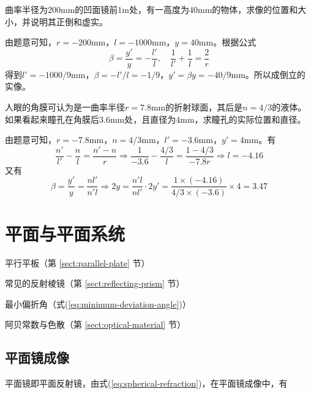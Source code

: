 \documentclass[cn,10pt,chinesefont=founder,math=mtpro2,cite=super,toc=onecol,twoside,openany]{elegantbook}
\begin{document}
\begin{problem}
	曲率半径为$200\mathrm{mm}$的凹面镜前$1\mathrm{m}$处，有一高度为$40\mathrm{mm}$的物体，求像的位置和大小，并说明其正倒和虚实。
\end{problem}
\begin{solution}
	由题意可知，$r=-200\mathrm{mm}$，$l=-1000\mathrm{mm}$，$y=40\mathrm{mm}$。根据公式
	\begin{equation}
	\beta=\frac{y'}{y}=-\frac{l'}{l},\quad \frac{1}{l'}+\frac{1}{l}=\frac{2}{r} \nonumber
	\end{equation}
	得到$l'=-1000/9\mathrm{mm}$，$\beta=-l'/l=-1/9$，$y'=\beta y=-40/9\mathrm{mm}$。所以成倒立的实像。
\end{solution}
\begin{problem}
	人眼的角膜可认为是一曲率半径$r=7.8\mathrm{mm}$的折射球面，其后是$n=4/3$的液体。如果看起来瞳孔在角膜后$3.6\mathrm{mm}$处，且直径为$4\mathrm{mm}$，求瞳孔的实际位置和直径。
\end{problem}
\begin{solution}
	由题意可知，$r=-7.8\mathrm{mm}$，$n=4/3\mathrm{mm}$，$l'=-3.6\mathrm{mm}$，$y'=4\mathrm{mm}$。有
	\begin{equation}
	\frac{n'}{l'}-\frac{n}{l}=\frac{n'-n}{r} \Rightarrow \frac{1}{-3.6}-\frac{4/3}{l}=\frac{1-4/3}{-7.8r} \Rightarrow l=-4.16 \nonumber
	\end{equation}
	又有
	\begin{equation}
	\beta=\frac{y'}{y}=\frac{nl'}{n'l} \Rightarrow 2y=\frac{n'l}{nl'}\cdot 2y'=\frac{1\times (-4.16)}{4/3\times (-3.6)}\times 4=3.47 \nonumber
	\end{equation}
	
\end{solution}

\chapter{平面与平面系统}

\begin{introduction}
	\item 平行平板（第 \ref{sect:parallel-plate} 节）
	\item 常见的反射棱镜（第 \ref{sect:reflecting-prism} 节）
	\item 最小偏折角（式(\ref{eq:minimum-deviation-angle})）
	\item 阿贝常数与色散（第 \ref{sect:optical-material} 节）
\end{introduction}

\section{平面镜成像}
平面镜即平面反射镜，由式(\ref{eq:spherical-refraction})，在平面镜成像中，有
\end{document}
